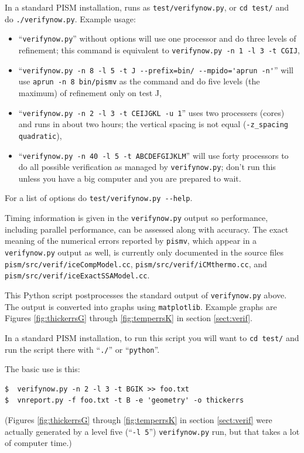 \documentclass[11pt,final]{amsart}
\begin{document}
In a standard PISM installation, runs as \verb|test/verifynow.py|, or \verb|cd test/| and do \verb|./verifynow.py|.  Example usage: \begin{itemize}
\item ``\verb|verifynow.py|'' without options will use one processor and do three levels of refinement; this command is equivalent to \verb|verifynow.py -n 1 -l 3 -t CGIJ|,
\item ``\verb|verifynow.py -n 8 -l 5 -t J --prefix=bin/ --mpido='aprun -n'|'' will use \verb|aprun -n 8 bin/pismv| as the command and do five levels (the maximum) of refinement only on test J,
\item ``\verb|verifynow.py -n 2 -l 3 -t CEIJGKL -u 1|'' uses two processers (cores) and runs in about two hours; the vertical spacing is not equal (\verb|-z_spacing quadratic|),
\item ``\verb|verifynow.py -n 40 -l 5 -t ABCDEFGIJKLM|'' will use forty processors to do all possible verification as managed by \verb|verifynow.py|; don't run this unless you have a big computer and you are prepared to wait.
\end{itemize}

For a list of options do \verb|test/verifynow.py --help|.

Timing information is given in the \verb|verifynow.py| output so performance, including parallel performance, can be assessed along with accuracy.  The exact meaning of the numerical errors reported by \verb|pismv|, which appear in a \verb|verifynow.py| output as well, is currently only documented in the source files \verb|pism/src/verif/iceCompModel.cc|, \verb|pism/src/verif/iCMthermo.cc|, and \verb|pism/src/verif/iceExactSSAModel.cc|.  


  This Python script postprocesses the standard output of \verb|verifynow.py| above.  The output is converted into graphs using \verb|matplotlib|.  Example graphs are Figures \ref{fig:thickerrsG} through \ref{fig:temperrsK} in section \ref{sect:verif}.

In a standard PISM installation, to run this script you will want to \verb|cd test/| and run the script there with ``\verb|./|'' or ``\verb|python|''.

The basic use is this:

\begin{verbatim}
$  verifynow.py -n 2 -l 3 -t BGIK >> foo.txt
$  vnreport.py -f foo.txt -t B -e 'geometry' -o thickerrs
\end{verbatim}
(Figures \ref{fig:thickerrsG} through \ref{fig:temperrsK} in section \ref{sect:verif} were actually generated by a level five (``\verb|-l 5|'') \verb|verifynow.py| run, but that takes a lot of computer time.)
\end{document}
